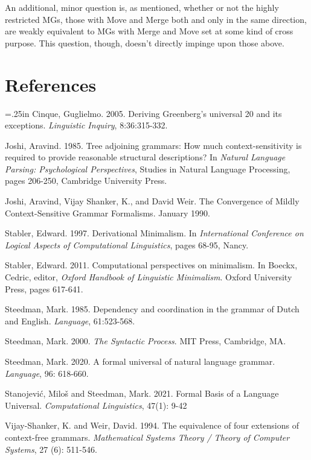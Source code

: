 \documentclass[12pt]{article}
\makeatletter
\newcommand{\hangpara}[2]{\hangindent#1\hangafter#2\noindent}
\newenvironment{hangparas}[2]{\setlength{\parindent}{\z@}%
  \everypar={\hangpara{#1}{#2}}}{\par}
\makeatother
\begin{document}
\noindent An additional, minor question is, as mentioned, whether or not the highly restricted MGs, those with Move and Merge both and only in the same direction, are weakly equivalent to MGs with Merge and Move set at some kind of cross purpose. This question, though, doesn't directly impinge upon those above.


\section{References}

\begin{hangparas}{.25in}{1}
\small
Cinque, Guglielmo. 2005. Deriving Greenberg's universal 20 and its exceptions. \textit{Linguistic Inquiry}, 8:36:315-332.

Joshi, Aravind. 1985. Tree adjoining grammars: How much context-sensitivity is required to provide reasonable structural descriptions? In \textit{Natural Language Parsing: Psychological Perspectives}, Studies in Natural Language Processing, pages 206-250, Cambridge University Press.

Joshi, Aravind, Vijay Shanker, K., and David Weir. The Convergence of Mildly Context-Sensitive Grammar Formalisms. January 1990.

Stabler, Edward. 1997. Derivational Minimalism. In \textit{International Conference on Logical Aspects of Computational Linguistics}, pages 68-95, Nancy.

Stabler, Edward. 2011. Computational perspectives on minimalism. In Boeckx, Cedric, editor, \textit{Oxford Handbook of Linguistic Minimalism}. Oxford University Press, pages 617-641.

Steedman, Mark. 1985. Dependency and coordination in the grammar of Dutch and English. \textit{Language}, 61:523-568.

Steedman, Mark. 2000. \textit{The Syntactic Process}. MIT Press, Cambridge, MA.

Steedman, Mark. 2020. A formal universal of natural language grammar. \textit{Language}, 96: 618-660.

Stanojevi\'{c}, Milo\v{s} and Steedman, Mark. 2021. Formal Basis of a Language Universal. \textit{Computational Linguistics}, 47(1): 9-42

Vijay-Shanker, K. and Weir, David. 1994. The equivalence of four extensions of context-free grammars. \textit{Mathematical Systems Theory / Theory of Computer Systems}, 27 (6): 511-546.

\end{hangparas}
\end{document}
